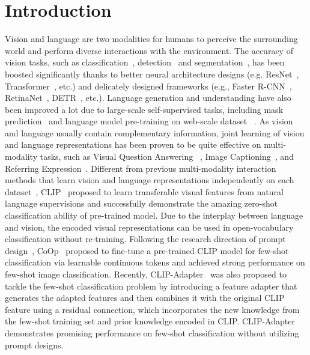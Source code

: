 \documentclass[10pt,twocolumn,letterpaper]{article}
\begin{document}
\section{Introduction}
\label{sec:intro}
Vision and language are two modalities for humans to perceive the surrounding world and perform diverse interactions with the environment. 
The accuracy of vision tasks, such as classification~\cite{krizhevsky2012imagenet, he2016deep,howard2017mobilenets,dosovitskiy2021vit,touvron2021training,mao2021dual}, detection~\cite{ren2015faster,carion2020end,gao2021fast} and segmentation~\cite{zheng2021rethinking}, has been boosted significantly thanks to better neural architecture designs (e.g. ResNet~\cite{he2016deep}, Transformer~\cite{vaswani2017attention}, etc.) and delicately designed frameworks (e.g., Faster R-CNN~\cite{ren2015faster}, RetinaNet~\cite{lin2017focal}, DETR~\cite{carion2020end}, etc.). 
Language generation and understanding have also been improved a lot due to large-scale self-supervised tasks, including mask prediction~\cite{devlin2018bert} and language model pre-training on web-scale dataset ~\cite{radford2018improving}. 
As vision and language usually contain complementary information, joint learning of vision and language representations has been proven to be quite effective on multi-modality tasks, such as Visual Question Answering ~\cite{antol2015vqa,anderson2018bottom,kim2018bilinear, gao2019dynamic}, Image Captioning~\cite{you2016image,huang2019attention}, and Referring Expression~\cite{yu2018mattnet}. 
Different from previous multi-modality interaction methods that learn vision and language representations independently on each dataset~\cite{anderson2018bottom,lu2019vilbert,tan2019lxmert}, CLIP~\cite{radford2021learning} proposed to learn transferable visual features from natural language supervisions and successfully demonstrate the amazing zero-shot classification ability of pre-trained model. Due to the interplay between language and vision, the encoded visual representations can be used in open-vocabulary classification without re-training. Following the research direction of prompt design~\cite{brown2020language,liu2021pre}, CoOp~\cite{zhou2021coop} proposed to fine-tune a pre-trained CLIP model for few-shot classification via learnable continuous tokens and achieved strong performance on few-shot image classification. Recently, 
CLIP-Adapter~\cite{gao2021clip} was also proposed to tackle the few-shot classification problem by introducing a feature adapter that generates the adapted features and then combines it with the original CLIP feature using a residual connection, which incorporates the new knowledge from the few-shot training set and prior knowledge encoded in CLIP. CLIP-Adapter demonstrates promising performance on few-shot classification without utilizing prompt designs.
\end{document}
